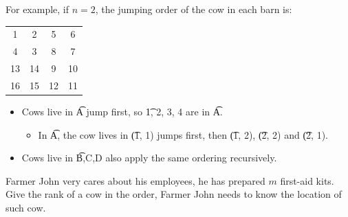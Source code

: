 \newpage
For example, if $n=2$, the jumping order of the cow in each barn is:
\begin{center}
  \begin{table}[h]
    \centering
    \begin{tabular}{|c c c c|}
      \hline
      1   &   2   &   5   &   6   \\
      4   &   3   &   8   &   7   \\
      13  &   14  &   9   &   10  \\
      16  &   15  &   12  &   11  \\
      \hline
    \end{tabular}
  \end{table}
  \begin{itemize}
    \item Cows live in \t{A} jump first, so \t{1, 2, 3, 4} are in \t{A}.
      \begin{itemize}
        \item In \t{A}, the cow lives in \t{(1, 1)} jumps first, then \t{(1, 2)}, \t{(2, 2)} and \t{(2, 1)}.
      \end{itemize}
    \item Cows live in \t{B,C,D} also apply the same ordering recursively.
  \end{itemize}
\end{center}


Farmer John very cares about his employees, he has prepared $m$ first-aid kits.
Give the rank of a cow in the order, Farmer John needs to know the location of such cow.
